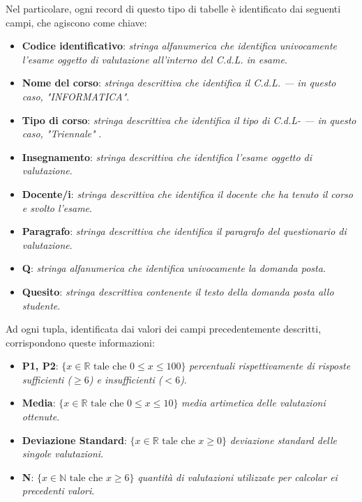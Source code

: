 Nel particolare, ogni record di questo tipo di tabelle è identificato dai seguenti campi, che agiscono come chiave:

\begin{itemize}
	\item \textbf{Codice identificativo}: \textit{stringa alfanumerica che identifica univocamente l'esame oggetto di valutazione all'interno del C.d.L. in esame}.
	\item \textbf{Nome del corso}: \textit{stringa descrittiva che identifica il C.d.L. --- in questo caso, "INFORMATICA"}.
	\item \textbf{Tipo di corso}: \textit{stringa descrittiva che identifica il tipo di C.d.L- --- in questo caso, "Triennale" }.
	\item \textbf{Insegnamento}: \textit{stringa descrittiva che identifica l'esame oggetto di valutazione}.
	\item \textbf{Docente/i}: \textit{stringa descrittiva che identifica il docente che ha tenuto il corso e svolto l'esame}.
	\item \textbf{Paragrafo}: \textit{stringa descrittiva che identifica il paragrafo del questionario di valutazione}.
	\item \textbf{Q}: \textit{stringa alfanumerica che identifica univocamente la domanda posta}.
	\item \textbf{Quesito}: \textit{stringa descrittiva contenente il testo della domanda posta allo studente}.
\end{itemize}

Ad ogni tupla, identificata dai valori dei campi precedentemente descritti, corrispondono queste informazioni:

\begin{itemize}
	\item \textbf{P1, P2}: $ \{ x \in \mathbb{R} \text{ tale che } 0 \leq x \leq 100 \} $ \textit{ percentuali rispettivamente di risposte sufficienti ($ \geq 6$) e insufficienti ($ < 6$)}.
	\item \textbf{Media}:  $ \{ x \in \mathbb{R} \text{ tale che } 0 \leq x \leq 10 \} $\textit{ media artimetica delle valutazioni ottenute}.
	\item \textbf{Deviazione Standard}:  $ \{ x \in \mathbb{R} \text{ tale che } x \geq 0\} $\textit{ deviazione standard delle singole valutazioni}.
	\item \textbf{N}:  $ \{ x \in \mathbb{N} \text{ tale che } x \geq 6\} $\textit{ quantità di valutazioni utilizzate per calcolar ei precedenti valori}.
\end{itemize}

